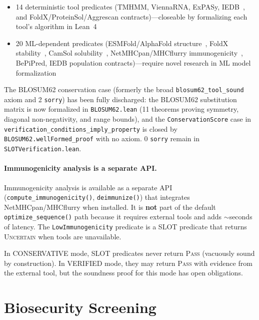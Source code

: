 \documentclass[11pt,a4paper]{article}
\theoremstyle{definition}
\newcommand{\PASS}{\textsc{Pass}}
\newcommand{\UNCERTAIN}{\textsc{Uncertain}}
\begin{document}
\begin{itemize}[leftmargin=*,itemsep=1pt]
\item 14 deterministic tool predicates (TMHMM, ViennaRNA, ExPASy, IEDB~\cite{vita2019iedb}, and FoldX/ProteinSol/Aggrescan contracts)---closeable by formalizing each tool's algorithm in Lean~4
\item 20 ML-dependent predicates (ESMFold/AlphaFold structure~\cite{lin2023esm}, FoldX stability~\cite{schymkowitz2005foldx}, CamSol solubility~\cite{sormanni2015camsol}, NetMHCpan/MHCflurry immunogenicity~\cite{reynisson2020netmhcpan}, BePiPred, IEDB population contracts)---require novel research in ML model formalization
\end{itemize}

The BLOSUM62 conservation case (formerly the broad \texttt{blosum62\_tool\_sound} axiom and 2 \texttt{sorry}) has been fully discharged: the BLOSUM62 substitution matrix is now formalized in \texttt{BLOSUM62.lean} (11 theorems proving symmetry, diagonal non-negativity, and range bounds), and the \texttt{ConservationScore} case in \texttt{verification\_conditions\_imply\_property} is closed by \texttt{BLOSUM62.wellFormed\_proof} with no axiom. 0 \texttt{sorry} remain in \texttt{SLOTVerification.lean}.

\paragraph{Immunogenicity analysis is a separate API.} Immunogenicity analysis is available as a separate API (\texttt{compute\_immunogenicity()}, \texttt{deimmunize()}) that integrates NetMHCpan/MHCflurry when installed. It is \textbf{not} part of the default \texttt{optimize\_sequence()} path because it requires external tools and adds $\sim$seconds of latency. The \texttt{LowImmunogenicity} predicate is a SLOT predicate that returns \UNCERTAIN{} when tools are unavailable.

In CONSERVATIVE mode, SLOT predicates never return \PASS{} (vacuously sound by construction). In VERIFIED mode, they may return \PASS{} with evidence from the external tool, but the soundness proof for this mode has open obligations.

\section{Biosecurity Screening}\label{sec:biosecurity}
\end{document}
